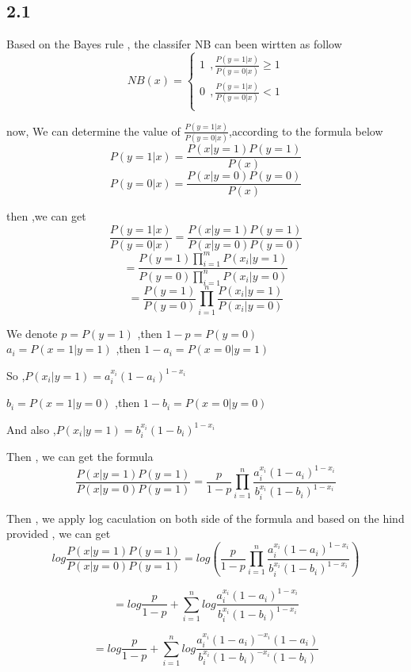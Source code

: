 \documentclass[a4paper,12pt]{article}
\begin{document}
\subsection*{2.1}

Based on the Bayes rule , the classifer NB can been wirtten as follow\\
$$ NB(x)=\left\{
\begin{aligned}
1 \ \ , \frac{P(y=1|x)}{P(y=0|x)} \geq 1 \\
0 \ \ , \frac{P(y=1|x)}{P(y=0|x)} < 1 \\
\end{aligned}
\right.
$$

now, We can determine the value of $\frac{P(y=1|x)}{P(y=0|x)}$,according to the formula below\\
$$P(y=1|x) = \frac{P(x|y=1)P(y=1)}{P(x)}$$  
$$P(y=0|x) =\frac{P(x|y=0)P(y=0)}{P(x)} $$

then ,we can get \\
$$\frac{P(y=1|x)}{P(y=0|x)} = \frac{P(x|y=1)P(y=1)}{P(x|y=0)P(y=0)}$$
$$= \frac{P(y=1)\prod\limits_{i=1}^m P(x_i|y=1)}{P(y=0)\prod\limits_{i=1}^n P(x_i|y=0)} $$
$$= \frac{P(y=1)}{P(y=0)} \prod\limits_{i=1}^n \frac{P(x_i|y=1)}{P(x_i|y=0)}$$

We denote $p = P(y=1)$ ,then $1-p = P(y=0)$\\
$a_i = P(x=1 | y=1)$ ,then $1-a_i = P(x=0|y=1)$
\begin{center}
So  ,$P(x_i|y=1)=a_i^{x_i}(1-a_i)^{1-x_i}$\\  
\end{center}
$b_i = P(x=1 | y=0)$ ,then $1-b_i = P(x=0|y=0)$
\begin{center}
And also  ,$P(x_i|y=1)=b_i^{x_i}(1-b_i)^{1-x_i}$\\  
\end{center}
Then , we can get the formula \\
$$\frac{P(x|y=1)P(y=1)}{P(x|y=0)P(y=1)} = \frac{p}{1-p}\prod\limits_{i=1}^n \frac{a_i^{x_i}(1-a_i)^{1-x_i}}{b_i^{x_i}(1-b_i)^{1-x_i}}$$

Then , we apply log caculation on both side of the formula and based on the hind provided , we can get
$$log\frac{P(x|y=1)P(y=1)}{P(x|y=0)P(y=1)} = log(\frac{p}{1-p}\prod\limits_{i=1}^n \frac{a_i^{x_i}(1-a_i)^{1-x_i}}{b_i^{x_i}(1-b_i)^{1-x_i}})$$

$$=log\frac{p}{1-p}+\sum\limits_{i=1}^nlog\frac{a_i^{x_i}(1-a_i)^{1-x_i}}{b_i^{x_i}(1-b_i)^{1-x_i}}$$


$$=log\frac{p}{1-p}+\sum\limits_{i=1}^n log\frac{a_i^{x_i}(1-a_i)^{-x_i}(1-a_i)}{b_i^{x_i}(1-b_i)^{-x_i}(1-b_i)}$$
\end{document}
